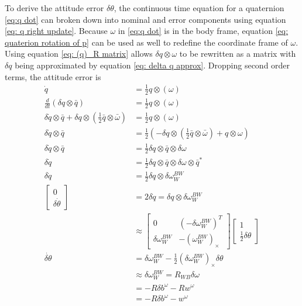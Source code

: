To derive the attitude error $\delta \theta$, the continuous time equation for a quaternion \eqref{eq:q dot} can broken down into nominal and error components using equation \eqref{eq: q right update}. Because $\omega$ in \eqref{eq:q dot} is in the body frame, equation \eqref{eq: quaterion rotation of p} can be used as well to redefine the coordinate frame of $\omega$. Using equation \eqref{eq: (q)_R matrix} allows $\delta q \otimes \omega$ to be rewritten as a matrix with $\delta q$ being approximated by equation \eqref{eq: delta q approx}. Dropping second order terms, the attitude error is
\begin{equation}
    \begin{split}
        \dot{q} &= \frac{1}{2} q \otimes (\omega)\\
        \frac{d}{dt} (\delta q \otimes \bar{q}) &= \frac{1}{2} q \otimes (\omega)\\
        \delta \dot{q} \otimes \bar{q} + \delta q \otimes (\frac{1}{2} \bar{q} \otimes \bar{\omega}) &= \frac{1}{2} q \otimes (\omega)\\
        \delta \dot{q} \otimes \bar{q} &= \frac{1}{2} (-\delta q \otimes (\frac{1}{2} \bar{q} \otimes \bar{\omega}) + q \otimes \omega)\\
        \delta \dot{q} \otimes \bar{q} &= \frac{1}{2} \delta q \otimes \bar{q} \otimes \delta \omega \\
        \delta \dot{q} &= \frac{1}{2} \delta q \otimes \bar{q} \otimes \delta \omega \otimes \bar{q}^*\\
        \delta \dot{q} &= \frac{1}{2} \delta q \otimes \delta \omega_W^{BW}\\
        \begin{bmatrix}
            0\\
            \delta \dot{\theta}
        \end{bmatrix}
        &=  2 \delta \dot{q} = \delta q \otimes \delta \omega_W^{BW}\\
        &\approx \begin{bmatrix}
            0 & (-\delta \omega_W^{BW})^T \\
            \delta \omega_W^{BW} & -(\omega_W^{BW})_{\times}
        \end{bmatrix}
        \begin{bmatrix}
            1 \\
            \frac{1}{2} \delta \theta 
        \end{bmatrix}\\
        \dot{\delta \theta} &= \delta \omega_W^{BW} - \frac{1}{2} (\delta \omega_W^{BW})_{\times} \delta \theta\\
        &\approx \delta \omega_W^{BW} = R_{WB} \delta \omega\\
        &= -R \delta b^{\omega} - R w^{\omega}\\
        &=  -R \delta b^{\omega} - w^{\omega}
    \end{split}
    \label{eq: delta theta cont}
\end{equation}
